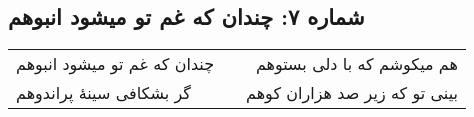 \begin{center}
\section*{شماره ۷: چندان که غم تو میشود انبوهم}
\label{sec:007}
\begin{longtable}{l p{0.5cm} r}
چندان که غم تو میشود انبوهم
&&
هم میکوشم که با دلی بستوهم
\\
گر بشکافی سینهٔ پراندوهم
&&
بینی تو که زیر صد هزاران کوهم
\\
\end{longtable}
\end{center}
